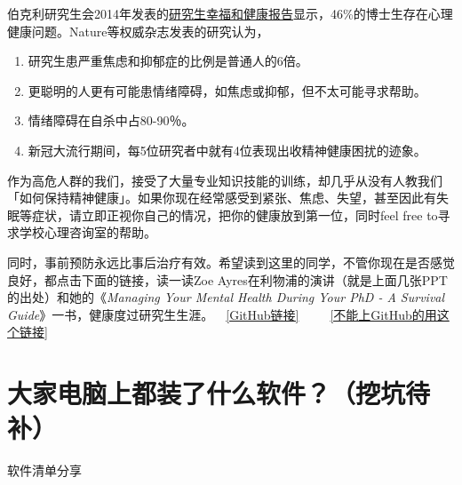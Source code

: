 伯克利研究生会2014年发表的\href{http://ga.berkeley.edu/wellbeingreport}{研究生幸福和健康报告}显示，46\%的博士生存在心理健康问题。Nature等权威杂志发表的研究认为，
\begin{enumerate}
    \item 研究生患严重焦虑和抑郁症的比例是普通人的6倍。
    \item 更聪明的人更有可能患情绪障碍，如焦虑或抑郁，但不太可能寻求帮助。
    \item 情绪障碍在自杀中占80-90％。
    \item 新冠大流行期间，每5位研究者中就有4位表现出收精神健康困扰的迹象。
\end{enumerate}

作为高危人群的我们，接受了大量专业知识技能的训练，却几乎从没有人教我们「如何保持精神健康」。如果你现在经常感受到紧张、焦虑、失望，甚至因此有失眠等症状，请立即正视你自己的情况，把你的健康放到第一位，同时feel free to寻求学校心理咨询室的帮助。

同时，事前预防永远比事后治疗有效。希望读到这里的同学，不管你现在是否感觉良好，都点击下面的链接，读一读Zoe Ayres在利物浦的演讲（就是上面几张PPT的出处）和她的《\textit{Managing Your Mental Health During Your PhD - A Survival Guide}》一书，健康度过研究生生涯。~~\href{https://github.com/kaiwu-astro/xp_pgrs_unofficial_guide/tree/main/fileshare}{[GitHub链接]}~~~~~\href{https://cowtransfer.com/s/ca761995ed6945}{[不能上GitHub的用这个链接]}

\section{大家电脑上都装了什么软件？（挖坑待补）}
软件清单分享
